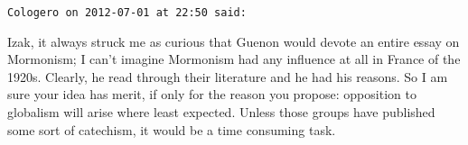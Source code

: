 \begin{footnotesize}
\begin{sffamily}
\hfill

\texttt{Cologero on 2012-07-01 at 22:50 said: }

Izak, it always struck me as curious that Guenon would devote an entire essay on Mormonism; I can't imagine Mormonism had any influence at all in France of the 1920s. Clearly, he read through their literature and he had his reasons. So I am sure your idea has merit, if only for the reason you propose: opposition to globalism will arise where least expected. Unless those groups have published some sort of catechism, it would be a time consuming task.


\hfill


\end{sffamily}\end{footnotesize}
